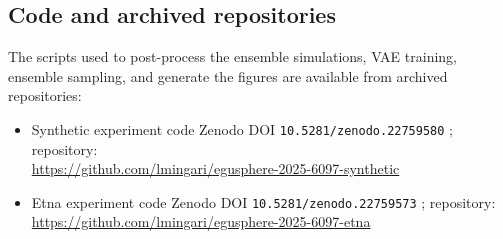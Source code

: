 \documentclass[acp,manuscript,noline]{copernicus}
\begin{document}
\subsection{Code and archived repositories}
The scripts used to post-process the ensemble simulations, VAE training,
ensemble sampling, and generate the figures are available from archived
repositories:
\begin{itemize}
  \item Synthetic experiment code Zenodo DOI \texttt{10.5281/zenodo.22759580} \citep{mingari2026supplementary-synthetic}; repository: \\
    \url{https://github.com/lmingari/egusphere-2025-6097-synthetic}
  \item Etna experiment code Zenodo DOI \texttt{10.5281/zenodo.22759573} \citep{mingari2026supplementary-etna}; repository: \\
    \url{https://github.com/lmingari/egusphere-2025-6097-etna}
\end{itemize}



\end{document}
